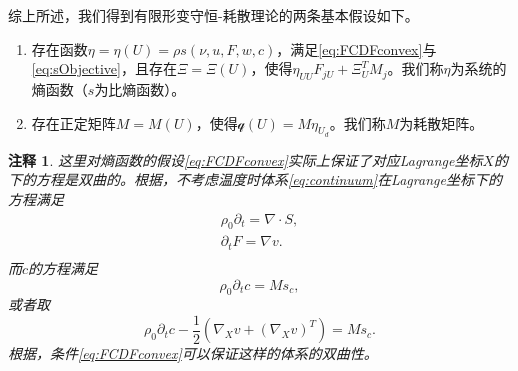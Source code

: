 \documentclass{article}
\newtheorem{remark}{注释}
\begin{document}
综上所述，我们得到有限形变守恒-耗散理论的两条基本假设如下。
\begin{enumerate}
		\item 存在函数$\eta = \eta (U) = \rho s(\nu,u,F,w,c)$，满足\eqref{eq:FCDFconvex}与\eqref{eq:sObjective}，且存在$\Xi=\Xi(U)$，使得$\eta_{UU} F_{jU} + \Xi_U^T M_j $。我们称$\eta$为系统的熵函数（$s$为比熵函数）。
		\item 存在正定矩阵$M = M(U)$，使得$\mathcal{q}(U) = M \eta_{U_d}$。我们称$M$为耗散矩阵。
\end{enumerate}
\begin{remark}
这里对熵函数的假设\eqref{eq:FCDFconvex}实际上保证了对应Lagrange坐标$X$的下的方程是双曲的。根据\cite{dafermos2010hyperbolic}，不考虑温度时体系\eqref{eq:continuum}在Lagrange坐标下的方程满足
\begin{subequations}\label{eq:continuum}
\begin{align*}
	\rho_0 \partial_t = \nabla \cdot S, \\
	\partial_t F = \nabla v.\\
\end{align*}
\end{subequations}
而$c$的方程满足
\begin{equation*}
	\rho_0 \partial_t c = M s_c,
\end{equation*}
或者取
\begin{equation*}
	\rho_0 \partial_t c - \frac{1}{2} (\nabla_X v + (\nabla_X v)^T)= M s_c.
\end{equation*}
根据\cite{dafermos2010hyperbolic}，条件\eqref{eq:FCDFconvex}可以保证这样的体系的双曲性。
\end{remark}
\end{document}
